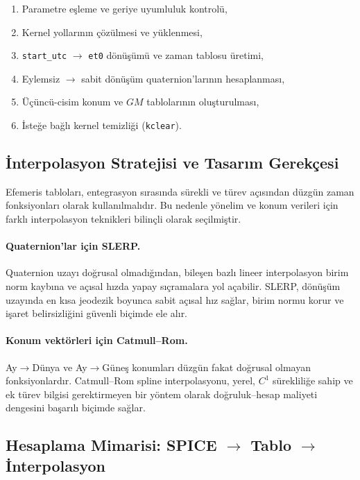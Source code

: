 \begin{enumerate}
  \item Parametre eşleme ve geriye uyumluluk kontrolü,
  \item Kernel yollarının çözülmesi ve yüklenmesi,
  \item \texttt{start\_utc} $\rightarrow$ \texttt{et0} dönüşümü ve zaman tablosu üretimi,
  \item Eylemsiz $\rightarrow$ sabit dönüşüm quaternion’larının hesaplanması,
  \item Üçüncü-cisim konum ve $GM$ tablolarının oluşturulması,
  \item İsteğe bağlı kernel temizliği (\texttt{kclear}).
\end{enumerate}

\subsection*{İnterpolasyon Stratejisi ve Tasarım Gerekçesi}

Efemeris tabloları, entegrasyon sırasında sürekli ve türev açısından düzgün
zaman fonksiyonları olarak kullanılmalıdır.
Bu nedenle yönelim ve konum verileri için
farklı interpolasyon teknikleri bilinçli olarak seçilmiştir.

\paragraph{Quaternion’lar için SLERP.}
Quaternion uzayı doğrusal olmadığından,
bileşen bazlı lineer interpolasyon birim norm kaybına
ve açısal hızda yapay sıçramalara yol açabilir.
SLERP, dönüşüm uzayında en kısa jeodezik boyunca sabit açısal hız sağlar,
birim normu korur ve işaret belirsizliğini güvenli biçimde ele alır.

\paragraph{Konum vektörleri için Catmull--Rom.}
Ay$\rightarrow$Dünya ve Ay$\rightarrow$Güneş konumları düzgün fakat doğrusal olmayan fonksiyonlardır.
Catmull--Rom spline interpolasyonu,
yerel, $C^1$ sürekliliğe sahip ve ek türev bilgisi gerektirmeyen bir yöntem olarak
doğruluk–hesap maliyeti dengesini başarılı biçimde sağlar.

\subsection*{Hesaplama Mimarisi: SPICE $\rightarrow$ Tablo $\rightarrow$ İnterpolasyon}

